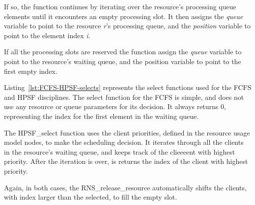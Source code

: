 If so, the function continues by iterating over the resource's processing queue elements until it encounters an empty processing slot. It then assigns the \emph{queue} variable to point to the resource \emph{r}'s processing queue, and the \emph{position} variable to point to the element index \emph{i}.

If all the processing slots are reserved the function assign the \emph{queue} variable to point to the resource's waiting queue, and the position variable to point to the first empty index.



Listing~\ref{lst:FCFS-HPSF-selects} represents the select functions used for the FCFS and HPSF disciplines. The select function for the FCFS is simple, and does not use any resource or queue parameters for its decision. It always returns 0, representing the index for the first element in the waiting queue.

The HPSF\_select function uses the client priorities, defined in the resource usage model nodes, to make the scheduling decision. It iterates through all the clients in the resource's waiting queue, and keeps track of the clieeeent with highest priority. After the iteration is over, is returns the index of the client with highest priority.

Again, in both cases, the RNS\_release\_resource automatically shifts the clients, with index larger than the selected, to fill the empty slot.





